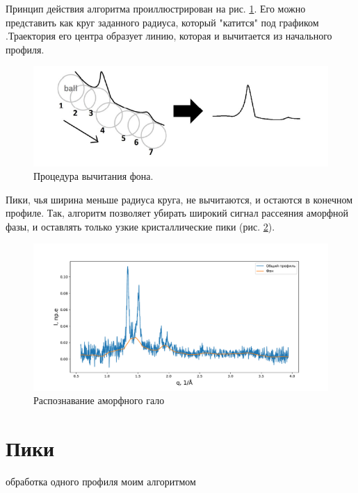 	Принцип действия алгоритма проиллюстрирован на рис. \ref{fig:ball}. 
	Его можно представить как круг заданного радиуса, который "катится"  под графиком \cite{ball2018}.Траектория его центра образует линию, которая и вычитается из начального профиля. 
		\begin{figure}[ht]
	    \centering
	    \includegraphics[width=\linewidth]{fig/ball.PNG}
	    \caption{Процедура вычитания фона.}
	    \label{fig:ball}
	\end{figure}

	
	Пики, чья ширина меньше радиуса круга, не вычитаются, и остаются в конечном профиле. Так, алгоритм позволяет убирать широкий сигнал рассеяния аморфной фазы, и оставлять только узкие кристаллические пики (рис. \ref{fig:ball-profile}).
	
	


	\begin{figure}[ht]
	    \centering
	    \includegraphics[width=\linewidth]{fig/ball-profile.pdf}
	    \caption{Распознавание аморфного гало}
	    \label{fig:ball-profile}
	\end{figure}



\section{Пики}

	обработка одного профиля моим алгоритмом
	
